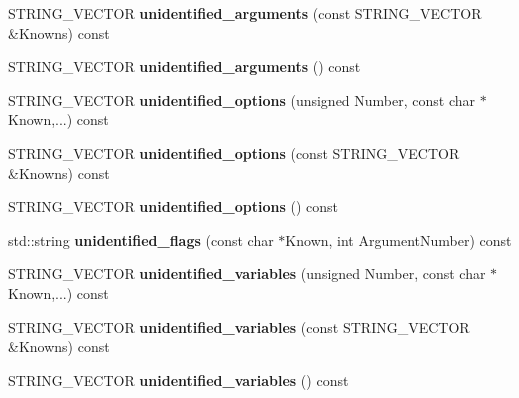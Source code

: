 \begin{DoxyCompactItemize}
\item 
\hypertarget{classGetPot_a08a1a9ab9ae443888718cacf10afd06d}{
STRING\_\-VECTOR {\bfseries unidentified\_\-arguments} (const STRING\_\-VECTOR \&Knowns) const }
\label{classGetPot_a08a1a9ab9ae443888718cacf10afd06d}

\item 
\hypertarget{classGetPot_a88e7f9c789b8bea223127dbfecea5041}{
STRING\_\-VECTOR {\bfseries unidentified\_\-arguments} () const }
\label{classGetPot_a88e7f9c789b8bea223127dbfecea5041}

\item 
\hypertarget{classGetPot_ac11b52993315a910ad7ee9fd5729605a}{
STRING\_\-VECTOR {\bfseries unidentified\_\-options} (unsigned Number, const char $\ast$Known,...) const }
\label{classGetPot_ac11b52993315a910ad7ee9fd5729605a}

\item 
\hypertarget{classGetPot_a70b0e051abb2af10b5bef708db80f774}{
STRING\_\-VECTOR {\bfseries unidentified\_\-options} (const STRING\_\-VECTOR \&Knowns) const }
\label{classGetPot_a70b0e051abb2af10b5bef708db80f774}

\item 
\hypertarget{classGetPot_a7a51d05e04dfdba0788c6f399120b35a}{
STRING\_\-VECTOR {\bfseries unidentified\_\-options} () const }
\label{classGetPot_a7a51d05e04dfdba0788c6f399120b35a}

\item 
\hypertarget{classGetPot_a3b4c3f3128a38c2a24c977f9c5371c1a}{
std::string {\bfseries unidentified\_\-flags} (const char $\ast$Known, int ArgumentNumber) const }
\label{classGetPot_a3b4c3f3128a38c2a24c977f9c5371c1a}

\item 
\hypertarget{classGetPot_a534677efd6bf66f2b7bbb03e2f588a7f}{
STRING\_\-VECTOR {\bfseries unidentified\_\-variables} (unsigned Number, const char $\ast$Known,...) const }
\label{classGetPot_a534677efd6bf66f2b7bbb03e2f588a7f}

\item 
\hypertarget{classGetPot_a5685c87e7392e8936fedcc74f811c504}{
STRING\_\-VECTOR {\bfseries unidentified\_\-variables} (const STRING\_\-VECTOR \&Knowns) const }
\label{classGetPot_a5685c87e7392e8936fedcc74f811c504}

\item 
\hypertarget{classGetPot_a605018ceff57881e1607608a4c978906}{
STRING\_\-VECTOR {\bfseries unidentified\_\-variables} () const }
\label{classGetPot_a605018ceff57881e1607608a4c978906}


\end{DoxyCompactItemize}
